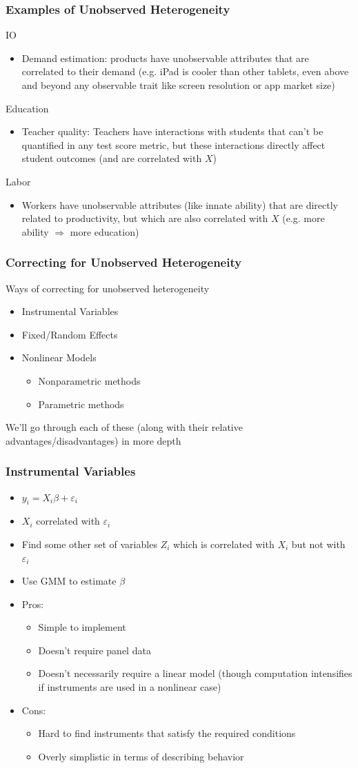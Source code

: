 \documentclass[english,xcolor=dvipsnames]{beamer}
\newcommand{\bi}{\begin{itemize}}
\newcommand{\ei}{\end{itemize}}
\begin{document}
\begin{frame}
\frametitle{Examples of Unobserved Heterogeneity}
   IO
      \bi 
      \item Demand estimation: products have unobservable attributes that are correlated to their demand (e.g. iPad is cooler than other tablets, even above and beyond any observable trait like screen resolution or app market size)
      \ei
   Education
      \bi 
      \item Teacher quality: Teachers have interactions with students that can't be quantified in any test score metric, but these interactions directly affect student outcomes (and are correlated with $X$)
      \ei
   Labor
      \bi 
      \item Workers have unobservable attributes (like innate ability) that are directly related to productivity, but which are also correlated with $X$ (e.g. more ability $\Rightarrow$ more education)
      \ei
\end{frame}

\begin{frame}
\frametitle{Correcting for Unobserved Heterogeneity}
Ways of correcting for unobserved heterogeneity
      \bi 
      \item Instrumental Variables
      \item Fixed/Random Effects
      \item Nonlinear Models
         \bi 
         \item Nonparametric methods
         \item Parametric methods
         \ei
      \ei
We'll go through each of these (along with their relative advantages/disadvantages) in more depth
\end{frame}

\begin{frame}
\frametitle{Instrumental Variables}
   \bi 
   \item $y_{i} = X_{i}\beta + \varepsilon_{i}$
   \item $X_{i}$ correlated with $\varepsilon_{i}$
   \item Find some other set of variables $Z_{i}$ which is correlated with $X_{i}$ but not with $\varepsilon_{i}$
   \item Use GMM to estimate $\beta$
   \item Pros:
      \bi 
      \item Simple to implement
      \item Doesn't require panel data
      \item Doesn't necessarily require a linear model (though computation intensifies if instruments are used in a nonlinear case)
      \ei
   \item Cons:
      \bi 
      \item Hard to find instruments that satisfy the required conditions
      \item Overly simplistic in terms of describing behavior
      \ei
   \ei
\end{frame}
\end{document}
